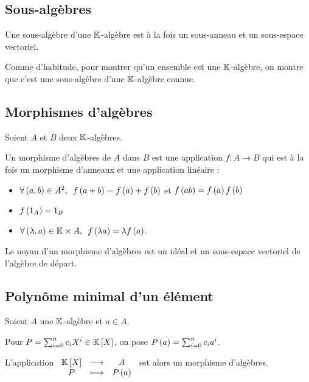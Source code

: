 \subsection{Sous-algèbres}

\begin{defi}
Une sous-algèbre d'une \(\mathbb{K}\)-algèbre est à la fois un sous-anneau et un sous-espace vectoriel.
\end{defi}

Comme d'habitude, pour montrer qu'un ensemble est une \(\mathbb{K}\)-algèbre, on montre que c'est une sous-algèbre d'une \(\mathbb{K}\)-algèbre connue.

\subsection{Morphismes d'algèbres}

\begin{defi}
Soient \(A\) et \(B\) deux \(\mathbb{K}\)-algèbres.

Un morphisme d'algèbres de \(A\) dans \(B\) est une application \(f:A\to B\) qui est à la fois un morphisme d'anneaux et une application linéaire :

\begin{itemize}
    \item \(\quantifs{\forall\paren{a,b}\in A^2}f\paren{a+b}=f\paren{a}+f\paren{b}\) et \(f\left(ab\right)=f\left(a\right)f\left(b\right)\) \\
    \item \(f\left(1_A\right)=1_B\) \\
    \item \(\quantifs{\forall\paren{\lambda,a}\in\K\times A}f\paren{\lambda a}=\lambda f\paren{a}\).
\end{itemize}
\end{defi}

\begin{prop}
Le noyau d'un morphisme d'algèbres est un idéal et un sous-espace vectoriel de l'algèbre de départ.
\end{prop}

\subsection{Polynôme minimal d'un élément}

\begin{prop}
Soient \(A\) une \(\mathbb{K}\)-algèbre et \(a\in A\).

Pour \(P=\sum_{i=0}^nc_iX^i\in\poly\), on pose \(P\left(a\right)=\sum_{i=0}^nc_ia^i\).

L'application \(\fonctionlambda{\poly}{A}{P}{P\paren{a}}\) est alors un morphisme d'algèbres.
\end{prop}

